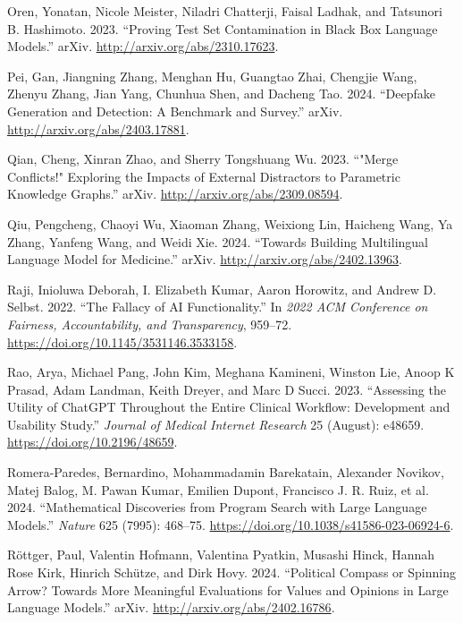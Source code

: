 \documentclass[
  Letterpaper,
]{scrbook}
\newlength{\cslhangindent}
\newenvironment{CSLReferences}[2] %
 {\begin{list}{}{%
  \setlength{\itemindent}{0pt}
  \setlength{\leftmargin}{0pt}
  \setlength{\parsep}{0pt}
  \ifodd #1
   \setlength{\leftmargin}{\cslhangindent}
   \setlength{\itemindent}{-1\cslhangindent}
  \fi
  \setlength{\itemsep}{#2\baselineskip}}}
 {\end{list}}
\begin{document}
\begin{CSLReferences}{1}{0}
Oren, Yonatan, Nicole Meister, Niladri Chatterji, Faisal Ladhak, and
Tatsunori B. Hashimoto. 2023. {``Proving {Test} {Set} {Contamination} in
{Black} {Box} {Language} {Models}.''} arXiv.
\url{http://arxiv.org/abs/2310.17623}.

Pei, Gan, Jiangning Zhang, Menghan Hu, Guangtao Zhai, Chengjie Wang,
Zhenyu Zhang, Jian Yang, Chunhua Shen, and Dacheng Tao. 2024.
{``Deepfake {Generation} and {Detection}: {A} {Benchmark} and
{Survey}.''} arXiv. \url{http://arxiv.org/abs/2403.17881}.

Qian, Cheng, Xinran Zhao, and Sherry Tongshuang Wu. 2023. {``"{Merge}
{Conflicts}!" {Exploring} the {Impacts} of {External} {Distractors} to
{Parametric} {Knowledge} {Graphs}.''} arXiv.
\url{http://arxiv.org/abs/2309.08594}.

Qiu, Pengcheng, Chaoyi Wu, Xiaoman Zhang, Weixiong Lin, Haicheng Wang,
Ya Zhang, Yanfeng Wang, and Weidi Xie. 2024. {``Towards {Building}
{Multilingual} {Language} {Model} for {Medicine}.''} arXiv.
\url{http://arxiv.org/abs/2402.13963}.

Raji, Inioluwa Deborah, I. Elizabeth Kumar, Aaron Horowitz, and Andrew
D. Selbst. 2022. {``The {Fallacy} of {AI} {Functionality}.''} In
\emph{2022 {ACM} {Conference} on {Fairness}, {Accountability}, and
{Transparency}}, 959--72. \url{https://doi.org/10.1145/3531146.3533158}.

Rao, Arya, Michael Pang, John Kim, Meghana Kamineni, Winston Lie, Anoop
K Prasad, Adam Landman, Keith Dreyer, and Marc D Succi. 2023.
{``Assessing the {Utility} of {ChatGPT} {Throughout} the {Entire}
{Clinical} {Workflow}: {Development} and {Usability} {Study}.''}
\emph{Journal of Medical Internet Research} 25 (August): e48659.
\url{https://doi.org/10.2196/48659}.

Romera-Paredes, Bernardino, Mohammadamin Barekatain, Alexander Novikov,
Matej Balog, M. Pawan Kumar, Emilien Dupont, Francisco J. R. Ruiz, et
al. 2024. {``Mathematical Discoveries from Program Search with Large
Language Models.''} \emph{Nature} 625 (7995): 468--75.
\url{https://doi.org/10.1038/s41586-023-06924-6}.

Röttger, Paul, Valentin Hofmann, Valentina Pyatkin, Musashi Hinck,
Hannah Rose Kirk, Hinrich Schütze, and Dirk Hovy. 2024. {``Political
{Compass} or {Spinning} {Arrow}? {Towards} {More} {Meaningful}
{Evaluations} for {Values} and {Opinions} in {Large} {Language}
{Models}.''} arXiv. \url{http://arxiv.org/abs/2402.16786}.


\end{CSLReferences}
\end{document}
